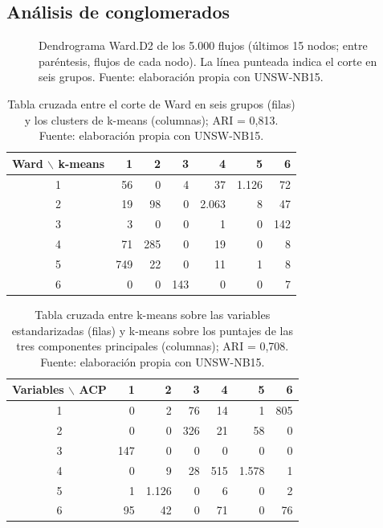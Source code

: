 \subsection{Análisis de conglomerados}
\label{anexo:cluster}

\begin{figure}[htbp]
  \centering
  \caption[Dendrograma Ward.D2 de los flujos]{Dendrograma Ward.D2 de los 5.000 flujos (últimos 15 nodos; entre paréntesis, flujos de cada nodo). La línea punteada indica el corte en seis grupos. Fuente: elaboración propia con UNSW-NB15.}
  \label{fig:a-dendro}
\end{figure}

\begin{table}[htbp]
  \centering
  \caption[Cruce Ward y k-means]{Tabla cruzada entre el corte de Ward en seis grupos (filas) y los clusters de k-means (columnas); ARI = 0,813. Fuente: elaboración propia con UNSW-NB15.}\label{tab:a-cruce-ward}
  \begin{tablacompacta}
  \begin{tabular}{@{}crrrrrr@{}}
  \toprule
  Ward $\backslash$ k-means & 1 & 2 & 3 & 4 & 5 & 6 \\
  \midrule
  1 & 56 & 0 & 4 & 37 & 1.126 & 72 \\
  2 & 19 & 98 & 0 & 2.063 & 8 & 47 \\
  3 & 3 & 0 & 0 & 1 & 0 & 142 \\
  4 & 71 & 285 & 0 & 19 & 0 & 8 \\
  5 & 749 & 22 & 0 & 11 & 1 & 8 \\
  6 & 0 & 0 & 143 & 0 & 0 & 7 \\
  \bottomrule
  \end{tabular}
  \end{tablacompacta}
\end{table}

\begin{table}[htbp]
  \centering
  \caption[Cruce k-means original y sobre puntajes del ACP]{Tabla cruzada entre k-means sobre las variables estandarizadas (filas) y k-means sobre los puntajes de las tres componentes principales (columnas); ARI = 0,708. Fuente: elaboración propia con UNSW-NB15.}\label{tab:a-cruce-acp}
  \begin{tablacompacta}
  \begin{tabular}{@{}crrrrrr@{}}
  \toprule
  Variables $\backslash$ ACP & 1 & 2 & 3 & 4 & 5 & 6 \\
  \midrule
  1 & 0 & 2 & 76 & 14 & 1 & 805 \\
  2 & 0 & 0 & 326 & 21 & 58 & 0 \\
  3 & 147 & 0 & 0 & 0 & 0 & 0 \\
  4 & 0 & 9 & 28 & 515 & 1.578 & 1 \\
  5 & 1 & 1.126 & 0 & 6 & 0 & 2 \\
  6 & 95 & 42 & 0 & 71 & 0 & 76 \\
  \bottomrule
  \end{tabular}
  \end{tablacompacta}
\end{table}

